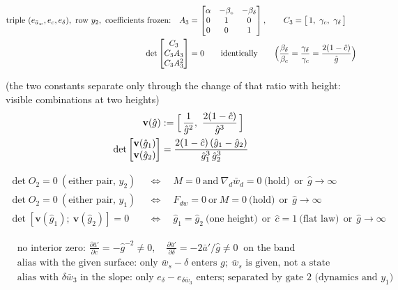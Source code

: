 \documentclass[11pt,a4paper,fontset=none]{ctexart}
\newcommand{\ba}{\bar{a}}
\newcommand{\bw}{\bar{w}}
\newcommand{\ap}{\ba'}
\newcommand{\ch}{\hat{c}}
\newcommand{\dl}{\delta}
\newcommand{\gs}{g}
\newcommand{\gh}{\hat{g}}
\begin{document}
\begin{align*}
\text{triple } (e_{\ba_w}, e_c, e_{\dl}),\ \text{row } y_2,\ \text{coefficients frozen:}\quad
A_3 &= \begin{bmatrix} \alpha & -\beta_c & -\beta_{\dl} \\ 0 & 1 & 0 \\ 0 & 0 & 1 \end{bmatrix}, \qquad
C_3 = \bigl[\,1,\ \gamma_c,\ \gamma_{\dl}\,\bigr] \\
\det\begin{bmatrix} C_3 \\ C_3A_3 \\ C_3A_3^{2} \end{bmatrix} &= 0 \qquad \text{identically}
\qquad\Bigl(\frac{\beta_{\dl}}{\beta_c} = \frac{\gamma_{\dl}}{\gamma_c} = \frac{2(1-\ch)}{\gh}\Bigr)
\end{align*}

(the two constants separate only through the change of that ratio with height: visible combinations at two heights)
\begin{align*}
\mathbf{v}(\gh) &:= \Bigl[\,\frac{1}{\gh^{2}},\ \frac{2(1-\ch)}{\gh^{3}}\,\Bigr] \\
\det\begin{bmatrix} \mathbf{v}(\gh_1) \\ \mathbf{v}(\gh_2) \end{bmatrix}
                &= \frac{2(1-\ch)\,(\gh_1 - \gh_2)}{\gh_1^{3}\,\gh_2^{3}}
\end{align*}

\begin{align*}
\det O_2 = 0 \ (\text{either pair, } y_2) \quad&\Longleftrightarrow\quad M = 0 \ \text{and}\ \nabla_d\bw_d = 0 \ \text{(hold)} \ \ \text{or}\ \ \gh \to \infty \\
\det O_2 = 0 \ (\text{either pair, } y_1) \quad&\Longleftrightarrow\quad F_{dw} = 0 \ \text{or}\ M = 0 \ \text{(hold)} \ \ \text{or}\ \ \gh \to \infty \\
\det[\mathbf{v}(\gh_1);\ \mathbf{v}(\gh_2)] = 0 \quad&\Longleftrightarrow\quad \gh_1 = \gh_2 \ \text{(one height)} \ \ \text{or}\ \ \ch = 1 \ \text{(flat law)} \ \ \text{or}\ \ \gh \to \infty
\end{align*}

\begin{align*}
&\text{no interior zero: } \frac{\partial\ap}{\partial c} = -\gh^{-2} \ne 0,\quad \frac{\partial\ap}{\partial\dl} = -2\ap/\gh \ne 0 \ \text{ on the band} \\
&\text{alias with the given surface: only } \bw_s - \dl \text{ enters } \gs;\ \bw_s \text{ is given, not a state} \\
&\text{alias with } \delta\bw_3 \text{ in the slope: only } e_{\dl} - e_{\delta\bw_3} \text{ enters; separated by gate 2 (dynamics and } y_1\text{)}
\end{align*}
\end{document}
